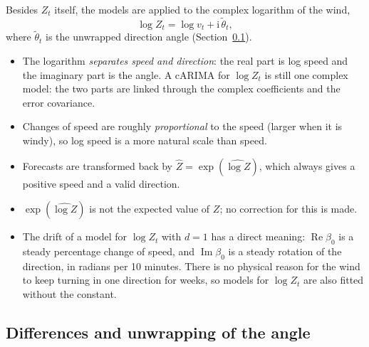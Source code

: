 \documentclass[11pt,a4paper]{article}
\newcommand{\iu}{\mathrm{i}}
\renewcommand{\Re}{\operatorname{Re}}
\renewcommand{\Im}{\operatorname{Im}}
\begin{document}
Besides $Z_t$ itself, the models are applied to the complex logarithm of the wind,
\begin{equation}
  \log Z_t = \log v_t + \iu\,\tilde\theta_t ,
\end{equation}
where $\tilde\theta_t$ is the unwrapped direction angle (Section~\ref{sec:diff}).
\begin{itemize}
  \item The logarithm \emph{separates speed and direction}: the real part is log speed and the
    imaginary part is the angle. A cARIMA for $\log Z_t$ is still one complex model: the two parts
    are linked through the complex coefficients and the error covariance.
  \item Changes of speed are roughly \emph{proportional} to the speed (larger when it is windy), so
    log speed is a more natural scale than speed.
  \item Forecasts are transformed back by $\hat Z = \exp(\widehat{\log Z})$, which always gives a
    positive speed and a valid direction.
  \item $\exp(\widehat{\log Z})$ is not the expected value of $Z$; no correction for this is made.
  \item The drift of a model for $\log Z_t$ with $d = 1$ has a direct meaning: $\Re\beta_0$ is a
    steady percentage change of speed, and $\Im\beta_0$ is a steady rotation of the direction, in
    radians per 10 minutes. There is no physical reason for the wind to keep turning in one
    direction for weeks, so models for $\log Z_t$ are also fitted without the constant.
\end{itemize}

\subsection{Differences and unwrapping of the angle}\label{sec:diff}
\end{document}
